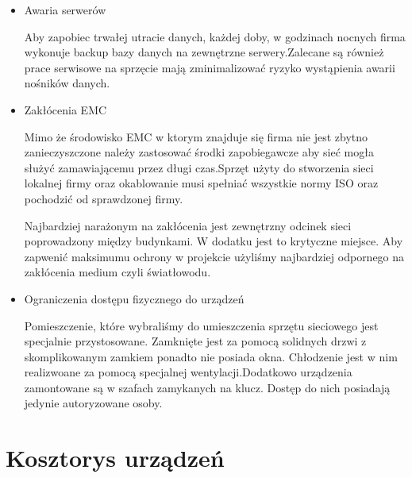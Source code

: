 \documentclass{report}
\begin{document}
\begin{itemize}
\item {Awaria serwerów}

Aby zapobiec trwałej utracie danych, każdej doby, w godzinach nocnych firma wykonuje backup bazy danych na
zewnętrzne serwery.Zalecane są również prace serwisowe na  sprzęcie
mają zminimalizować ryzyko wystąpienia awarii nośników danych.

\item {Zakłócenia EMC}

Mimo że środowisko EMC w ktorym znajduje się firma nie jest zbytno zanieczyszczone należy zastosować środki zapobiegawcze
aby sieć mogła służyć zamawiającemu przez długi czas.Sprzęt użyty do
stworzenia sieci lokalnej firmy oraz okablowanie musi spełniać wszystkie normy ISO
oraz pochodzić od sprawdzonej firmy.

Najbardziej narażonym na zakłócenia jest zewnętrzny odcinek sieci poprowadzony między budynkami. W dodatku jest to krytyczne miejsce. 
Aby zapwenić maksimumu ochrony w projekcie użyliśmy najbardziej odpornego na zakłócenia medium czyli światłowodu.


\item {Ograniczenia dostępu fizycznego do urządzeń}

Pomieszczenie, które wybraliśmy do umieszczenia sprzętu sieciowego jest specjalnie przystosowane.
Zamknięte jest za pomocą solidnych drzwi z skomplikowanym zamkiem ponadto nie posiada okna. Chłodzenie jest w nim
realizwoane za pomocą specjalnej wentylacji.Dodatkowo urządzenia zamontowane są w szafach zamykanych na klucz. 
Dostęp do nich posiadają jedynie autoryzowane osoby.

\end{itemize}

\section{Kosztorys urządzeń}

\end{document}

